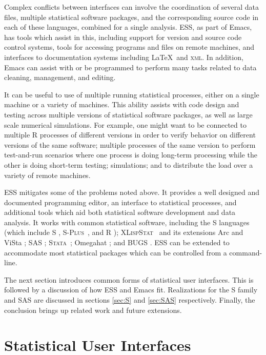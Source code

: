 \documentclass{article}
\newcommand*{\Splus}{\textsc{S-Plus}}
\newcommand*{\XLispStat}{\textsc{XLispStat}}
\newcommand*{\Stata}{\textsc{Stata}}
\begin{document}
Complex conflicts between interfaces can involve the coordination of
several data files, multiple statistical software packages, and the
corresponding source code in each of these languages, combined for a
single analysis.  ESS, as part of Emacs, has tools which assist in
this, including support for version and source code control systems,
tools for accessing programs and files on remote machines, and
interfaces to documentation systems including \LaTeX\ and
\textsc{xml}.  In addition, Emacs can assist with or be programmed to
perform many tasks related to data cleaning, management, and editing.

It can be useful to use of multiple running statistical processes,
either on a single machine or a variety of machines.  This ability
assists with code design and testing across multiple versions of
statistical software packages, as well as large scale numerical
simulations.  For example, one might want to be connected to multiple
R processes of different versions in order to verify behavior on
different versions of the same software; multiple processes of the
same version to perform test-and-run scenarios where one process is
doing long-term processing while the other is doing short-term
testing; simulations; and to distribute the load over a variety of
remote machines.

ESS mitigates some of the problems noted above.  It provides a well
designed and documented programming editor, an interface to
statistical processes, and additional tools which aid both statistical
software development and data analysis.  It works with common
statistical software, including the S languages (which include S
\citep{BecRCW88,ChaJH92,ChaJ98}, \Splus\ \citep{Splus}, and R
\citep{ihak:gent:1996}); \XLispStat\ \citep{Tier90} and its extensions
Arc \citep{Cook:Weisberg:1999} and ViSta \citep{youn:fald:mcfa:1992};
SAS \citep{SAS:8.0}; \Stata\ \citep{Stata:6.0}; Omegahat
\citep{DTLang:2000}; and BUGS \citep{SpieThomBest:1999}.  ESS can be
extended to accommodate most statistical packages which can be
controlled from a command-line.

The next section introduces common forms of statistical user
interfaces.  This is followed by a discussion of how ESS and Emacs
fit.  Realizations for the S family and SAS are discussed in sections
\ref{sec:S} and \ref{sec:SAS} respectively.  Finally, the conclusion
brings up related work and future extensions.

\section{Statistical User Interfaces}
\label{sec:UI}
\end{document}
